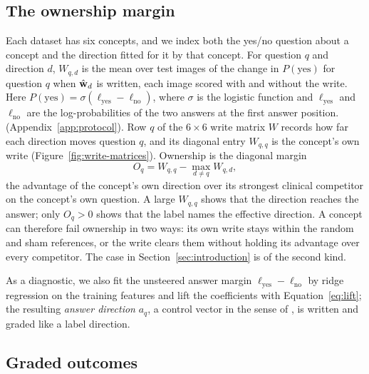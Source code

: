 \documentclass[11pt]{article}
\begin{document}
\subsection{The ownership margin}
\label{sec:ownership}

Each dataset has six concepts, and we index both the yes/no question about a concept and the direction fitted for it by that concept. For question $q$ and direction $d$, $W_{q,d}$ is the mean over test images of the change in $P(\mathrm{yes})$ for question $q$ when $\hat{\mathbf{w}}_d$ is written, each image scored with and without the write. Here $P(\mathrm{yes})=\sigma(\ell_{\mathrm{yes}}-\ell_{\mathrm{no}})$, where $\sigma$ is the logistic function and $\ell_{\mathrm{yes}}$ and $\ell_{\mathrm{no}}$ are the log-probabilities of the two answers at the first answer position. (Appendix~\ref{app:protocol}). Row $q$ of the $6\times6$ write matrix $W$ records how far each direction moves question $q$, and its diagonal entry $W_{q,q}$ is the concept's own write (Figure~\ref{fig:write-matrices}). Ownership is the diagonal margin
\begin{equation}
O_q=W_{q,q}-\max_{d\neq q}W_{q,d},
\label{eq:margin}
\end{equation}
the advantage of the concept's own direction over its strongest clinical competitor on the concept's own question. A large $W_{q,q}$ shows that the direction reaches the answer; only $O_q>0$ shows that the label names the effective direction. A concept can therefore fail ownership in two ways: its own write stays within the random and sham references, or the write clears them without holding its advantage over every competitor. The case in Section~\ref{sec:introduction} is of the second kind.

As a diagnostic, we also fit the unsteered answer margin $\ell_{\mathrm{yes}}-\ell_{\mathrm{no}}$ by ridge regression on the training features and lift the coefficients with Equation~\ref{eq:lift}; the resulting \emph{answer direction} $a_q$, a control vector in the sense of \citet{zou2023representation}, is written and graded like a label direction.

\subsection{Graded outcomes}
\label{sec:grades}
\end{document}
